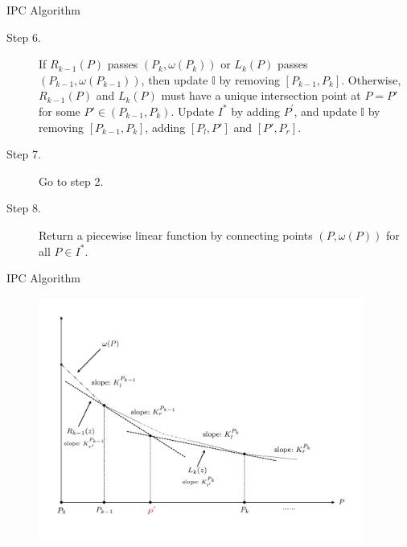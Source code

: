 \documentclass[14pt]{beamer}
\begin{document}
\begin{frame}{IPC Algorithm}
	\begin{description}
	\justifying
	\footnotesize
  \item[Step 6.] If $R_{k-1}(P)$ passes $(P_{k},\omega(P_{k}))$ or $L_{k}(P)$ passes $(P_{k-1},\omega(P_{k-1}))$, then update $\mathbb{I}$ by removing
  $[P_{k-1},P_{k}]$. Otherwise, $R_{k-1}(P)$ and $L_{k}(P)$ must have a unique intersection point at $P=P'$ for some $P' \in (P_{k-1},P_{k})$.
  Update $I^*$ by adding $P^'$, and update $\mathbb{I}$ by removing $[P_{k-1},P_{k}]$, adding $[P_l,P']$ and $[P',P_r]$.
  \item[Step 7.] Go to step 2.
  \item[Step 8.] Return a piecewise linear function by connecting points $(P,\omega(P))$ for all $P \in I^*$.
	\end{description}
\end{frame}



\begin{frame}{IPC Algorithm}
	\vspace{-3mm}
	\begin{figure}[H]
	\centering
	\includegraphics[width=0.95\textwidth]{Figures/IPC}
	\end{figure}
	\centering
\end{frame}
\end{document}
